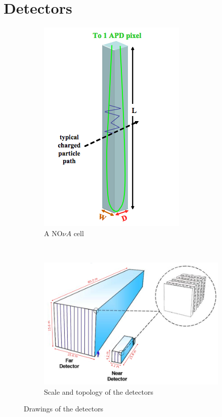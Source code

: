 \section{\nova Detectors}
\label{sec:detectors}

\begin{figure}
\begin{subfigure}[t]{0.25\textwidth}
                \includegraphics[height=0.35\textheight]{figures/figures/cell.png}
               \caption{A NO$\nu A$ cell}
                 \label{cell}
        \end{subfigure}
        ~
\begin{subfigure}[t]{0.75\textwidth}
                \centering
                \includegraphics[height=0.35\textheight]{figures/figures/detectors.png}
               \caption{Scale and topology of the \nova detectors}
                \label{detector}

        \end{subfigure}
        \caption{Drawings of the \nova detectors}
\end{figure}

